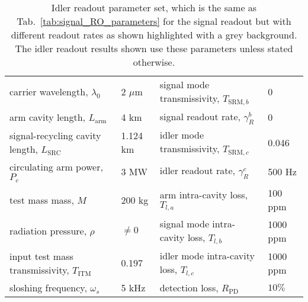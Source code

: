 \begin{table}[]
\centering
\begin{tabular}{@{}ll|ll@{}}
\toprule
carrier wavelength, $\lambda_0$ & 2 $\mu\text{m}$ & \cellcolor[HTML]{EFEFEF}signal mode transmissivity, $T_{\text{SRM},b}$ & \cellcolor[HTML]{EFEFEF} 0 \\
arm cavity length, $L_\text{arm}$ & 4 km & \cellcolor[HTML]{EFEFEF}signal readout rate, $\gamma^b_R$ & \cellcolor[HTML]{EFEFEF} 0 \\
signal-recycling cavity length, $L_\text{SRC}$ & 1.124 km & \cellcolor[HTML]{EFEFEF}idler mode transmissivity, $T_{\text{SRM},c}$ & \cellcolor[HTML]{EFEFEF} 0.046 \\
circulating arm power, $P_c$ & 3 MW & \cellcolor[HTML]{EFEFEF}idler readout rate, $\gamma^c_R$ & \cellcolor[HTML]{EFEFEF} 500 Hz \\
test mass mass, $M$ & 200 kg & arm intra-cavity loss, $T_{l,a}$ & 100 ppm \\
radiation pressure, $\rho$ & $\neq0$ & signal mode intra-cavity loss, $T_{l,b}$ & 1000 ppm \\
input test mass transmissivity, $T_\text{ITM}$ & 0.197 & idler mode intra-cavity loss, $T_{l,c}$ & 1000 ppm \\
sloshing frequency, $\omega_s$ & 5 kHz & detection loss, $R_\text{PD}$ & $10\%$ \\ \bottomrule
\end{tabular}
\caption{ Idler readout parameter set, which is the same as Tab.~\ref{tab:signal_RO_parameters} for the signal readout but with different readout rates as shown highlighted with a grey background. The idler readout results shown use these parameters unless stated otherwise.}
\label{tab:idler_RO_parameters}
\end{table}

